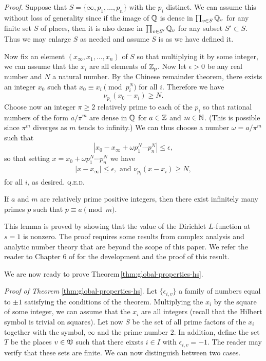\emph{Proof.} Suppose that \(S = \{\infty, p_1, \dots, p_n\}\) with the \(p_i\) distinct. We can assume this without loss of generality since if the image of \(\mathbb{Q}\) is dense in \(\prod_{v \in S} \mathbb{Q}_v\) for any finite set \(S\) of places, then it is also dense in \(\prod_{v \in S'} \mathbb{Q}_v\) for any subset \(S' \subset S\). Thus we may enlarge \(S\) as needed and assume \(S\) is as we have defined it.

Now fix an element \((x_{\infty}, x_1, \dots, x_n)\) of \(S\) so that multiplying it by some integer, we can assume that the \(x_i\) are all elements of \(\mathbb{Z}_p\). Now let \(\epsilon > 0\) be any real number and \(N\) a natural number. By the Chinese remainder theorem, there exists an integer \(x_0\) such that \(x_0 \equiv x_i \pmod{p_i^N}\) for all \(i\). Therefore we have
\[
    \nu_{p_i}(x_0 - x_i) \geq N.
\] 
Choose now an integer \(\pi \geq 2\) relatively prime to each of the \(p_i\)  so that rational numbers of the form \(a/\pi^m\) are dense in \(\mathbb{Q}\) for \(a \in \mathbb{Z}\) and \(m \in \mathbb{N}\). (This is possible since \(\pi^m\) diverges as \(m\) tends to infinity.) We can thus choose a number \(\omega = a/\pi^m\) such that
\[
    |x_0 - x_{\infty} + \omega p_1^N\cdots p_n^N| \leq \epsilon,
\]
so that setting \(x = x_0 + \omega p_1^N\cdots p_n^N\) we have
\begin{align*}
    |x - x_{\infty}| \leq \epsilon, \text{ and } \nu_{p_i}(x - x_i) \geq N,
\end{align*}
for all \(i\), as desired. {\scshape q.e.d.}

\medskip

\begin{lemmax}\label{lem:dirichlet}
    {\normalfont\cite[p.~25]{serre2012course}}
    If \(a\) and \(m\) are relatively prime positive integers, then there exist infinitely many primes \(p\) such that \(p \equiv a \pmod{m}\).
\end{lemmax}

This lemma is proved by showing that the value of the Dirichlet \(L\)-function at \(s = 1\) is nonzero. The proof requires some results from complex analysis and analytic number theory that are beyond the scope of this paper. We refer the reader to Chapter 6 of \cite{serre2012course} for the development and the proof of this result.

We are now ready to prove Theorem\,\ref{thm:global-properties-hs}.

\emph{Proof of Theorem} \ref{thm:global-properties-hs}. Let \(\{\epsilon_{i,v}\}\) a family of numbers equal to \(\pm 1\) satisfying the conditions of the theorem. Multiplying the \(x_i\) by the square of some integer, we can assume that the \(x_i\) are all integers (recall that the Hilbert symbol is trivial on squares). Let now \(S\) be the set of all prime factors of the \(x_i\) together with the symbol, \(\infty\) and the prime number \(2\). In addition, define the set \(T\) be the places \(v \in \mathfrak{V}\) such that there eixsts \(i \in I\) with \(\epsilon_{i, v} = -1\). The reader may verify that these sets  are finite. We can now distinguish between two cases.

